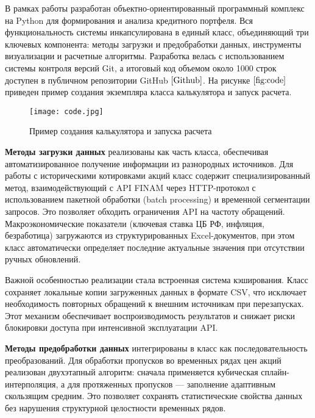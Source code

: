 \documentclass[]{article}
\begin{document}
	В рамках работы разработан объектно-ориентированный программный комплекс на Python для формирования и анализа кредитного портфеля. Вся функциональность системы инкапсулирована в единый класс, объединяющий три ключевых компонента: методы загрузки и предобработки данных, инструменты визуализации и расчетные алгоритмы. Разработка велась с использованием системы контроля версий Git, а итоговый код объемом около 1000 строк доступен в публичном репозитории GitHub $\cite{Github}$.
	На рисунке $\ref{fig:code}$ приведен пример создания экземпляра класса калькулятора и запуск расчета.
	
	
	\begin{figure}[ht] %
		\centering %
		\texttt{[image: code.jpg]} %
		\caption{Пример создания калькулятора и запуска расчета} %
		\label{fig:code} %
	\end{figure}
	
	
	\textbf{Методы загрузки данных} реализованы как часть класса, обеспечивая автоматизированное получение информации из разнородных источников. Для работы с историческими котировками акций класс содержит специализированный метод, взаимодействующий с API FINAM через HTTP-протокол с использованием пакетной обработки (batch processing) и временной сегментации запросов. Это позволяет обходить ограничения API на частоту обращений. Макроэкономические показатели (ключевая ставка ЦБ РФ, инфляция, безработица) загружаются из структурированных Excel-документов, при этом класс автоматически определяет последние актуальные значения при отсутствии ручных обновлений.
	
	Важной особенностью реализации стала встроенная система кэширования. Класс сохраняет локальные копии загруженных данных в формате CSV, что исключает необходимость повторных обращений к внешним источникам при перезапусках. Этот механизм обеспечивает воспроизводимость результатов и снижает риски блокировки доступа при интенсивной эксплуатации API.
	
	\textbf{Методы предобработки данных} интегрированы в класс как последовательность преобразований. Для обработки пропусков во временных рядах цен акций реализован двухэтапный алгоритм: сначала применяется кубическая сплайн-интерполяция, а для протяженных пропусков — заполнение адаптивным скользящим средним. Это позволяет сохранять статистические свойства данных без нарушения структурной целостности временных рядов.
	
\end{document}
